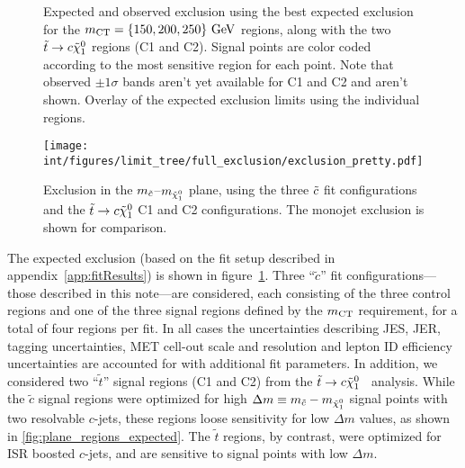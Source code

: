 \begin{figure}
\begin{center}
\end{center}
\caption[Exclusion in the $m_{\scharm}$--$m_{\neut}$ plane by signal region]
{ Expected and observed exclusion using the best expected exclusion for the $m_{\rm CT} = \{150, 200, 250\}\text{ GeV}$ regions, along with the two $\tilde{t} \to c \tilde{\chi}_1^0$ regions (C1 and C2). Signal points are color coded
according to the most sensitive region for each point. Note that observed $\pm 1 \sigma$ bands aren't yet available for C1 and C2 and aren't shown.  Overlay of the expected exclusion limits using the individual regions.}
\label{fig:exclusion_plane_regions}
\end{figure}

\begin{figure}
\texttt{[image: int/figures/limit\_tree/full\_exclusion/exclusion\_pretty.pdf]}
\caption[Exclusion in the $m_{\scharm}$--$m_{\neut}$ plane]{
Exclusion in the $m_{\scharm}$--$m_{\neut}$ plane, using the three $\tilde{c}$ fit configurations and the $\tilde{t} \to c \tilde{\chi}_1^0$ C1 and C2 configurations. The monojet exclusion is shown for comparison.}
\label{fig:plane_pretty_regions}
\end{figure}

The expected exclusion (based on the fit setup described in
appendix~\ref{app:fitResults}) is shown in
figure~\ref{fig:exclusion_plane_regions}. Three ``$\tilde{c}$'' fit
configurations---those described in this note---are considered, each
consisting of the three control regions and one of the three signal
regions defined by the $m_{\rm CT}$ requirement, for a total of four regions
per fit. In all cases the uncertainties describing JES, JER, tagging
uncertainties, MET cell-out scale and resolution and lepton ID
efficiency uncertainties are accounted for with additional fit
parameters. In addition, we considered two ``$\tilde{t}$'' signal
regions (C1 and C2) from the $\tilde{t} \to c
\tilde{\chi}_1^0$~\cite{CONF:stoptocharm:summer} analysis. While the $\tilde{c}$
signal regions were optimized for high $\Delta m \equiv m_{\tilde{c}} - m_{\tilde{\chi}_1^0}$
signal points with two resolvable $c$-jets, these regions loose
sensitivity for low $\Delta m$ values, as shown in
\cref{fig:plane_regions_expected}. The $\tilde{t}$ regions, by
contrast, were optimized for ISR boosted $c$-jets, and are sensitive
to signal points with low $\Delta m$.

